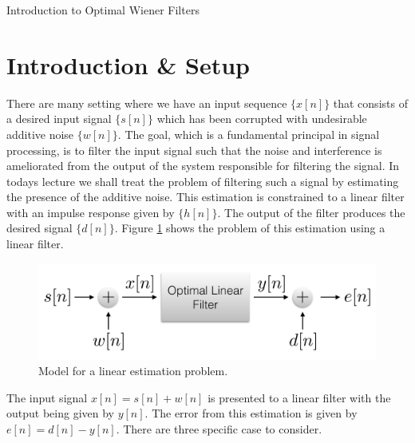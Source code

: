 \documentclass[12pt]{article}
\begin{document}
\pagestyle{fancy}
\cfoot{  }
\rfoot{\today}


\begin{center}
  {\huge
    Introduction to Optimal Wiener Filters
  }
\end{center}










\section{Introduction \& Setup}
There are many setting where we have an input sequence $\{x[n]\}$ that consists of a desired input signal $\{s[n]\}$ which has been corrupted with undesirable additive noise $\{w[n]\}$. The goal, which is a fundamental principal in signal processing, is to filter the input signal such that the noise and interference is ameliorated from the output of the system responsible for filtering the signal. In todays lecture we shall treat the problem of filtering such a signal by estimating the presence of the additive noise. This estimation is constrained to a linear filter with an impulse response given by $\{h[n]\}$. The output of the filter produces the desired signal $\{d[n]\}$. Figure \ref{fig:lin est} shows the problem of this estimation using a linear filter. 

\begin{figure}[h!]
  \centering
  \includegraphics[width=.7\textwidth]{wiener.pdf}
  \caption{Model for a linear estimation problem. }
  \label{fig:lin est}
\end{figure}

The input signal $x[n] = s[n]+w[n]$ is presented to a linear filter with the output being given by $y[n]$. The error from this estimation is given by $e[n] = d[n] - y[n]$. There are three specific case to consider. 
\end{document}
